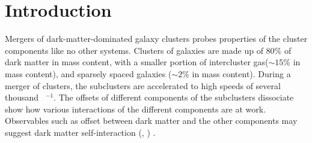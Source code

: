 \section{Introduction} 
Mergers of dark-matter-dominated galaxy clusters probes properties
of the cluster components like no other systems. 
Clusters of galaxies are made up of 80\% of dark matter in mass content, 
with a smaller  portion of intercluster gas($\sim15\%$ in mass content), and
sparsely spaced galaxies ($\sim2\%$ in mass content). During a merger of
clusters, the subclusters are accelerated to high speeds of several
thousand \kilo \meter~\second$^{-1}$. The offsets of different components
of the subclusters dissociate show how various interactions of the different
components are at work. Observables such as offset between dark
matter and the other components may suggest dark matter self-interaction
(\citealt{Kahlhoefer14}, \citealt{Randall2008d}) .  
\par

